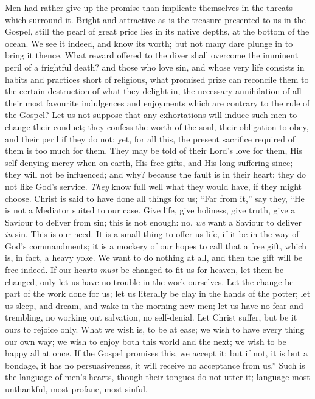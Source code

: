 Men had rather give up the promise than implicate themselves in the
threats which surround it. Bright and attractive as is the treasure
presented to us in the Gospel, still the pearl of great price lies in
its native depths, at the bottom of the ocean. We see it indeed, and
know its worth; but not many dare plunge in to bring it thence. What
reward offered to the diver shall overcome the imminent peril of a
frightful death? and those who love sin, and whose very life consists
in habits and practices short of religious, what promised prize can
reconcile them to the certain destruction of what they delight in, the
necessary annihilation of all their most favourite indulgences and
enjoyments which are contrary to the rule of the Gospel? Let us not
suppose that any exhortations will induce such men to change their
conduct; they confess the worth of the soul, their obligation to obey,
and their peril if they do not; yet, for all this, the present
sacrifice required of them is too much for them. They may be told of
their Lord's love for them, His self-denying mercy when on earth, His
free gifts, and His long-suffering since; they will not be influenced;
and why? because the fault is in their heart; they do not like God's
service. \emph{They} know full well what they would have, if they
might choose. Christ is said to have done all things for us; ``Far
from it,'' say they, ``He is not a Mediator suited to our
case. Give life, give holiness, give truth, give a Saviour to deliver
from sin; this is not enough: no, \emph{we} want a Saviour to deliver \emph{in}
sin. This is our need. It is a small thing to offer us life, if it be
in the way of God's commandments; it is a mockery of our hopes to call
that a free gift, which is, in fact, a heavy yoke. We want to do
nothing at all, and then the gift will be free indeed. If our hearts \emph{must}
be changed to fit us for heaven, let them be changed, only let us have
no trouble in the work ourselves. Let the change be part of the work
done for us; let us literally be clay in the hands of the potter; let
us sleep, and dream, and wake in the morning new men; let us have no
fear and trembling, no working out salvation, no self-denial. Let
Christ suffer, but be it ours to rejoice only. What we wish is, to be
at ease; we wish to have every thing our own way; we wish to enjoy
both this world and the next; we wish to be happy all at once. If the
Gospel promises this, we accept it; but if not, it is but a bondage,
it has no persuasiveness, it will receive no acceptance from us.''
Such is the language of men's hearts, though their tongues do not
utter it; language most unthankful, most profane, most sinful.


